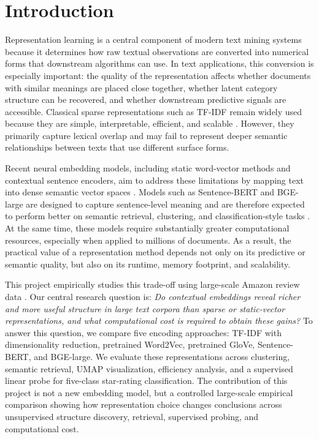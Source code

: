 \documentclass{article}
\begin{document}
\section{Introduction}

Representation learning is a central component of modern text mining systems because it determines how raw textual observations are converted into numerical forms that downstream algorithms can use. In text applications, this conversion is especially important: the quality of the representation affects whether documents with similar meanings are placed close together, whether latent category structure can be recovered, and whether downstream predictive signals are accessible. Classical sparse representations such as TF-IDF remain widely used because they are simple, interpretable, efficient, and scalable \cite{salton1988}. However, they primarily capture lexical overlap and may fail to represent deeper semantic relationships between texts that use different surface forms.

Recent neural embedding models, including static word-vector methods and contextual sentence encoders, aim to address these limitations by mapping text into dense semantic vector spaces \cite{mikolov2013,pennington2014,vaswani2017,devlin2019}. Models such as Sentence-BERT and BGE-large are designed to capture sentence-level meaning and are therefore expected to perform better on semantic retrieval, clustering, and classification-style tasks \cite{reimers2019,xiao2023}. At the same time, these models require substantially greater computational resources, especially when applied to millions of documents. As a result, the practical value of a representation method depends not only on its predictive or semantic quality, but also on its runtime, memory footprint, and scalability.

This project empirically studies this trade-off using large-scale Amazon review data \cite{hou2024bridging}. Our central research question is: \textit{Do contextual embeddings reveal richer and more useful structure in large text corpora than sparse or static-vector representations, and what computational cost is required to obtain these gains?} To answer this question, we compare five encoding approaches: TF-IDF with dimensionality reduction, pretrained Word2Vec, pretrained GloVe, Sentence-BERT, and BGE-large. We evaluate these representations across clustering, semantic retrieval, UMAP visualization, efficiency analysis, and a supervised linear probe for five-class star-rating classification. The contribution of this project is not a new embedding model, but a controlled large-scale empirical comparison showing how representation choice changes conclusions across unsupervised structure discovery, retrieval, supervised probing, and computational cost.
\end{document}

